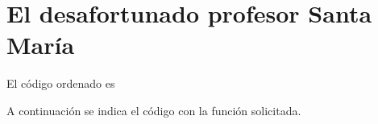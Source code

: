 \section{El desafortunado profesor Santa María}

El código ordenado es

    

  A continuación se indica el código con la función
  solicitada.
  
    
